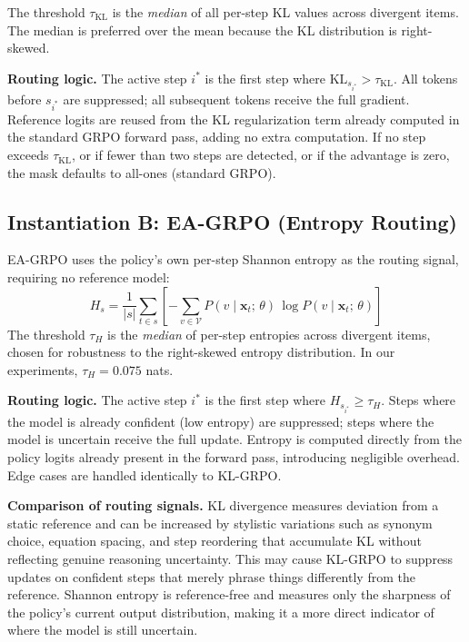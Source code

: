 \documentclass{article}
\begin{document}
The threshold $\tau_\text{KL}$ is the \emph{median} of all per-step KL values across divergent items. The median is preferred over the mean because the KL distribution is right-skewed.

\textbf{Routing logic.} The active step $i^*$ is the first step where $\text{KL}_{s_{i^*}} > \tau_\text{KL}$. All tokens before $s_{i^*}$ are suppressed; all subsequent tokens receive the full gradient. Reference logits are reused from the KL regularization term already computed in the standard GRPO forward pass, adding no extra computation. If no step exceeds $\tau_\text{KL}$, or if fewer than two steps are detected, or if the advantage is zero, the mask defaults to all-ones (standard GRPO).

\subsection{Instantiation B: EA-GRPO (Entropy Routing)}

EA-GRPO uses the policy's own per-step Shannon entropy as the routing signal, requiring no reference model:
\begin{equation}
H_s = \frac{1}{|s|} \sum_{t \in s} \left[-\sum_{v \in \mathcal{V}} P(v \mid \mathbf{x}_t;\, \theta)\, \log P(v \mid \mathbf{x}_t;\, \theta)\right]
\label{eq:step_entropy}
\end{equation}
The threshold $\tau_H$ is the \emph{median} of per-step entropies across divergent items, chosen for robustness to the right-skewed entropy distribution. In our experiments, $\tau_H = 0.075$ nats.

\textbf{Routing logic.} The active step $i^*$ is the first step where $H_{s_{i^*}} \geq \tau_H$. Steps where the model is already confident (low entropy) are suppressed; steps where the model is uncertain receive the full update. Entropy is computed directly from the policy logits already present in the forward pass, introducing negligible overhead. Edge cases are handled identically to KL-GRPO.

\textbf{Comparison of routing signals.} KL divergence measures deviation from a static reference and can be increased by stylistic variations such as synonym choice, equation spacing, and step reordering that accumulate KL without reflecting genuine reasoning uncertainty. This may cause KL-GRPO to suppress updates on confident steps that merely phrase things differently from the reference. Shannon entropy is reference-free and measures only the sharpness of the policy's current output distribution, making it a more direct indicator of where the model is still uncertain. 
\end{document}
